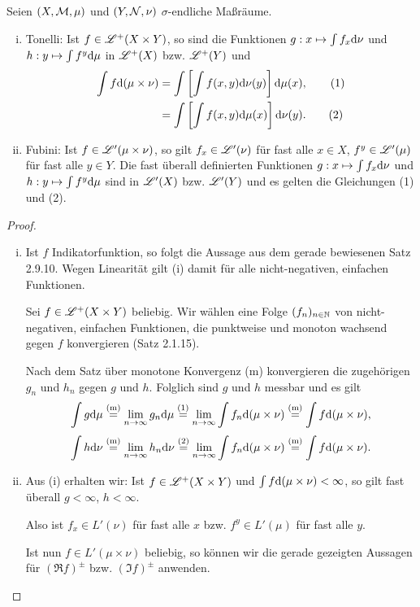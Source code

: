 \begin{thm}
 Seien $(X,\mathcal{M},\mu)$ und $(Y,\mathcal{N},\nu)$ $\sigma$-endliche Maßräume.
 
 \begin{enumerate}[(i)]
  \item Tonelli: Ist $f \in \mathscr{L}^+(X \times Y)$, so sind die Funktionen $g:x \mapsto \int f_x \mathrm{d} \nu$ und $h:y \mapsto \int f^y \mathrm{d} \mu$ in $\mathscr{L}^+(X)$ bzw. $\mathscr{L}^+(Y)$ und
  \begin{align*}
   \int f \mathrm{d} (\mu \times \nu)
     &= \int \left[ \int f(x,y) \mathrm{d} \nu(y) \right] \mathrm{d} \mu(x), \tag{1} \\
     &= \int \left[ \int f(x,y) \mathrm{d} \mu(x) \right] \mathrm{d} \nu(y). \tag{2}
  \end{align*}
  \item Fubini: Ist $f \in \mathscr{L}'(\mu \times \nu)$, so gilt $f_x \in \mathscr{L}'(\nu)$ für fast alle $x \in X$, $f^y \in \mathscr{L}'(\mu)$ für fast alle $y \in Y$. Die fast überall definierten Funktionen $g:x \mapsto \int f_x \mathrm{d} \nu$ und $h:y \mapsto \int f^y \mathrm{d} \mu$ sind in $\mathscr{L}'(X)$ bzw. $\mathscr{L}'(Y)$ und es gelten die Gleichungen (1) und (2).
 \end{enumerate}
\end{thm}

\begin{proof}
 \begin{enumerate}[(i)]
  \item Ist $f$ Indikatorfunktion, so folgt die Aussage aus dem gerade bewiesenen Satz 2.9.10. Wegen Linearität gilt (i) damit für alle nicht-negativen, einfachen Funktionen.
 
  Sei $f \in \mathscr{L}^+(X \times Y)$ beliebig. Wir wählen eine Folge $(f_n)_{n \in \mathbb{N}}$ von nicht-negativen, einfachen Funktionen, die punktweise und monoton wachsend gegen $f$ konvergieren (Satz 2.1.15).
  
  Nach dem Satz über monotone Konvergenz (m) konvergieren die zugehörigen $g_n$ und $h_n$ gegen $g$ und $h$. Folglich sind $g$ und $h$ messbar und es gilt
  \[ \int g \mathrm{d} \mu \overset{(\text{m})}{=} \lim_{n \to \infty} g_n \mathrm{d} \mu \overset{(1)}{=} \lim_{n \to \infty} \int f_n \mathrm{d} (\mu \times \nu) \overset{(\text{m})}{=} \int f \mathrm{d} (\mu \times \nu), \]
  \[ \int h \mathrm{d} \nu \overset{(\text{m})}{=} \lim_{n \to \infty} h_n \mathrm{d} \nu \overset{(2)}{=} \lim_{n \to \infty} \int f_n \mathrm{d} (\mu \times \nu) \overset{(\text{m})}{=} \int f \mathrm{d} (\mu \times \nu). \]
  \item Aus (i) erhalten wir: Ist $f \in \mathscr{L}^+ (X \times Y)$ und $\int f \mathrm{d} (\mu \times \nu) < \infty$, so gilt fast überall $g < \infty$, $h < \infty$.
  
  Also ist $f_x \in L'(\nu)$ für fast alle $x$ bzw. $f^y \in L'(\mu)$ für fast alle $y$.
  
  Ist nun $f \in L'(\mu \times \nu)$ beliebig, so können wir die gerade
  gezeigten Aussagen für $(\Re f)^\pm$ bzw. $(\Im f)^\pm$ anwenden. 
  \qedhere
 \end{enumerate}
\end{proof}

